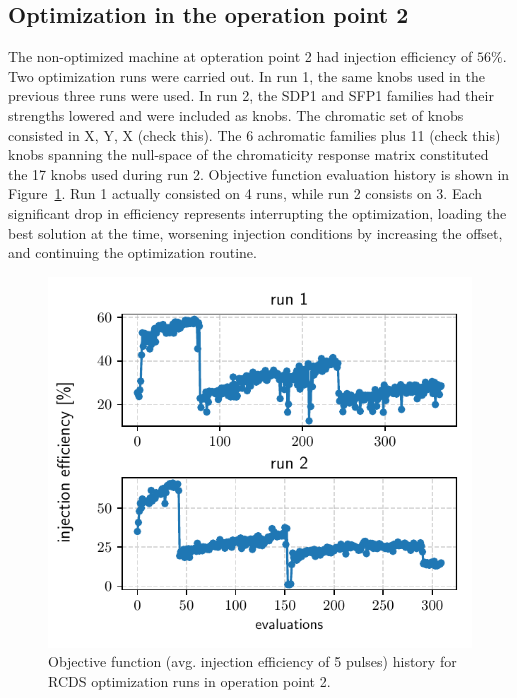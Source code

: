 \documentclass[a4paper,
               keeplastbox,   %
               ]{jacow}
\begin{document}
\subsection{Optimization in the operation point 2}
 The non-optimized machine at opteration point 2 had injection efficiency of $56\%$. Two optimization runs were carried out. In run 1, the same knobs used in the previous three runs were used. In run 2, the SDP1 and SFP1 families had their strengths lowered and were included as knobs. The chromatic set of knobs consisted in X, Y, X (check this). The 6 achromatic families plus 11 (check this) knobs spanning the null-space of the chromaticity response matrix constituted the 17 knobs used during run 2. Objective function evaluation history is shown in Figure~\ref{fig:newtunes_runs12}. Run 1 actually consisted on 4 runs, while run 2 consists on 3. Each significant drop in efficiency represents interrupting the optimization, loading the best solution at the time, worsening injection conditions by increasing the offset, and continuing the optimization routine.
\begin{figure}[!h]
   \includegraphics[width=\columnwidth]{newtunes_runs12.pdf}
   \caption{Objective function (avg. injection efficiency of 5 pulses) history for RCDS optimization runs in operation point 2.}
   \label{fig:newtunes_runs12}
\end{figure}
\end{document}

